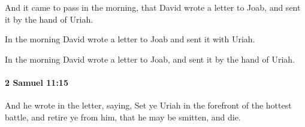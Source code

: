 			\begin{versebox}
					\item[BHS] 
					\item[ASV] And it came to pass in the morning, that David wrote a letter to Joab, and sent it by the hand of Uriah.
					\item[NIV] In the morning David wrote a letter to Joab and sent it with Uriah.
					\item[NRSV] In the morning David wrote a letter to Joab, and sent it by the hand of Uriah.
			\end{versebox}

		\paragraph{2 Samuel 11:15} %
			\label{2SAMUEL-11-15}

			And he wrote in the letter, saying, Set ye Uriah in the forefront of the hottest battle, and retire ye from him, that he may be smitten, and die.

